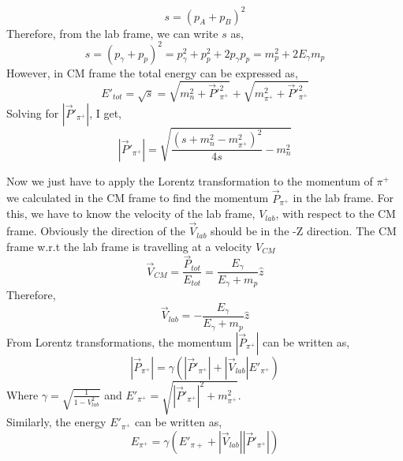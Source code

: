 \documentclass[11pt,letterpaper]{article}
\begin{document}
\vspace{0.1cm}
\begin{equation}
   s = (p_A + p_B)^2
\end{equation}
Therefore, from the lab frame, we can write $s$ as, 
\begin{equation}\label{equ: Mandelstam s in lab fram}
    s = (p_{\gamma} + p_{p})^2 = p_{\gamma}^2+p_{p}^2+2p_{\gamma}p_{p} = m_p^2 + 2E_{\gamma}m_p
\end{equation}
However, in CM frame the total energy can be expressed as,
\begin{equation}\label{equ: Mandelstam s in CM frame}
 E'_{tot} = \sqrt{s} = \sqrt{m_n^2 + \vec{P}'^2_{\pi^+}} + \sqrt{m^2_{\pi^+} + \vec{P}'^2_{\pi^+}} 
\end{equation}
Solving for $|\vec{P}'_{\pi^+}|$, I get,
\begin{equation}
  |\vec{P}'_{\pi^+}| = \sqrt{\frac{(s+m_n^2-m_{\pi^+}^2)^2}{4s} - m_n^2}  
  \label{equ:piplus_momentum}  
\end{equation}

\vspace{0.3cm}
Now we just have to apply the Lorentz transformation to the momentum of $\pi^+$ we calculated in the CM frame to find the momentum $\vec{P}_{\pi^+}$ in the lab frame. For this, we have to know the velocity of the lab frame, $V_{lab}$, with respect to the CM frame. Obviously the direction of the $\vec{V}_{lab}$ should be in the -Z direction. The CM frame w.r.t the lab frame is travelling at a velocity $V_{CM}$
\begin{equation}
    \vec{V}_{CM} = \frac{\vec{P}_{tot}}{E_{tot}} = \frac{E_{\gamma}}{E_{\gamma}+m_p}\hat{z}
    \label{equ:V_CM}
\end{equation}
Therefore, 
\begin{equation}
    \vec{V}_{lab} = -\frac{E_{\gamma}}{E_{\gamma}+m_p}\hat{z}
    \label{equ:V_lab}
\end{equation}
From Lorentz transformations, the momentum $|\vec{P}_{\pi^+}|$ can be written as,
\begin{equation}
    |\vec{P}_{\pi^+}| = \gamma(|\vec{P}'_{\pi^+}| + |\vec{V}_{lab}|E'_{\pi^+})
    \label{equ:max_piplus_mom_inlab}
\end{equation}
Where $\gamma = \sqrt{\frac{1}{1-V_{lab}^2}}$ and $E'_{\pi^+} = \sqrt{|\vec{P}'_{\pi^+}|^2+m_{\pi^+}^2}$.\\
Similarly, the energy $E'_{\pi^+}$ can be written as,
\begin{equation}
    E_{\pi^+} = \gamma(E'_{\pi+} + |\vec{V}_{lab}||\vec{P}'_{\pi^+}|)
    \label{equ:max_piplus_energy_inlab}
\end{equation}
\end{document}

